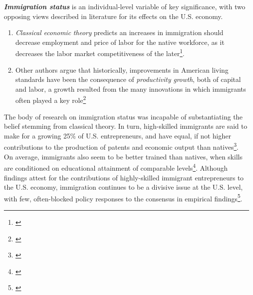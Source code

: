 \textbf{\textit{Immigration status}} is an individual-level variable of key significance, with two opposing views described in literature for its effects on the U.S. economy.
\renewcommand{\labelenumi}{\roman{enumi}}
\begin{enumerate}
  \item \textit{Classical economic theory} predicts an increases in immigration should decrease employment and price of labor for the native workforce, as it decreases the labor market competitiveness of the later\footnote{\cite{Hanson2012}}. 
  \item Other authors argue that historically, improvements in American living standards have been the consequence of \textit{productivity growth}, both of capital and labor, a growth resulted from the many innovations in which immigrants often played a key role\footnote{\cite{jones1995culture}}
\end{enumerate}
The body of research on immigration status was incapable of substantiating the belief stemming from classical theory. In turn, high-skilled immigrants are said to make for a growing 25\% of U.S. entrepreneurs, and have equal, if not higher contributions to the production of patents and economic output than natives\footnote{\cite{Kerr2013}}. On average, immigrants also seem to be better trained than natives, when skills are conditioned on educational attainment of comparable levels\footnote{\cite{Kerr2013}}. Although findings attest for the contributions of highly-skilled immigrant entrepreneurs to the U.S. economy, immigration continues to be a divisive issue at the U.S. level, with few, often-blocked policy responses to the consensus in empirical findings\footnote{\cite{Hanson2012}}. 

